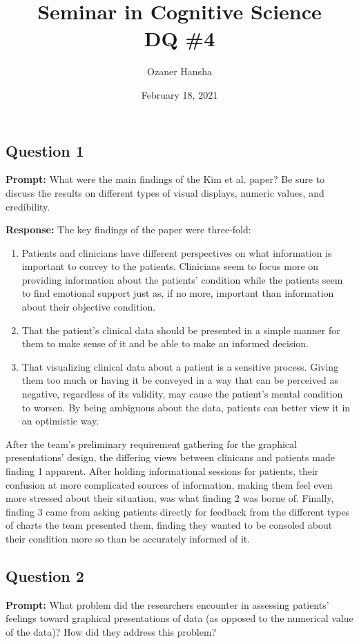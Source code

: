 \documentclass{article}
\begin{document}
\title{Seminar in Cognitive Science\\ DQ \#4}
\author{Ozaner Hansha}
\date{February 18, 2021}
\maketitle

\subsection*{Question 1}
\noindent\textbf{Prompt:} What were the main findings of the Kim et al. paper? Be sure to discuss the results on different types of visual displays, numeric values, and credibility. 
\bigskip

\noindent\textbf{Response:} The key findings of the paper were three-fold:
\begin{enumerate}
    \item Patients and clinicians have different perspectives on what information is important to convey to the patients. Clinicians seem to focus more on providing information about the patients' condition while the patients seem to find emotional support just as, if no more, important than information about their objective condition.
    \item That the patient's clinical data should be presented in a simple manner for them to make sense of it and be able to make an informed decision.
    \item That visualizing clinical data about a patient is a sensitive process. Giving them too much or having it be conveyed in a way that can be perceived as negative, regardless of its validity, may cause the patient's mental condition to worsen. By being ambiguous about the data, patients can better view it in an optimistic way.
\end{enumerate}

After the team's preliminary requirement gathering for the graphical presentations' design, the differing views between clinicans and patients made finding 1 apparent. After holding informational sessions for patients, their confusion at more complicated sources of information, making them feel even more stressed about their situation, was what finding 2 was borne of. Finally, finding 3 came from asking patients directly for feedback from the different types of charts the team presented them, finding they wanted to be consoled about their condition more so than be accurately informed of it.

\subsection*{Question 2}
\noindent\textbf{Prompt:} What problem did the researchers encounter in assessing patients' feelings toward graphical presentations of data (as opposed to the numerical value of the data)? How did they address this problem? 
\bigskip
\end{document}
